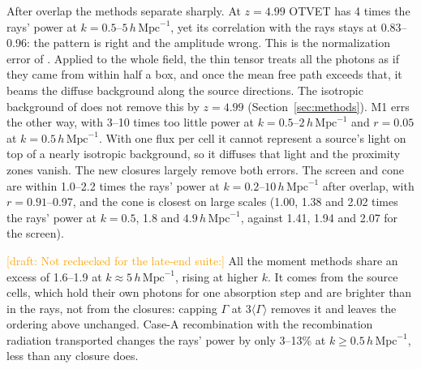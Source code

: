 \documentclass[11pt]{article}
\newcommand{\draft}[1]{\textcolor{orange}{[draft: #1]}}
\newcommand{\hmpc}{\,h\,\mathrm{Mpc}^{-1}}
\begin{document}
After overlap the methods separate sharply. At $z=4.99$ OTVET has
4 times the rays' power at $k=0.5$--$5\hmpc$, yet its correlation with the
rays stays at 0.83--0.96: the pattern is right and the amplitude wrong. This
is the normalization error of \citet{wu21}. Applied to the whole field,
the thin tensor treats all the photons as if they came from within half
a box, and once the mean free path exceeds that, it beams the diffuse
background along the source directions. The isotropic background of
\citet{gnedin01} does not remove this by $z=4.99$
(Section~\ref{sec:methods}). M1 errs the other way, with 3--10
times too little power at $k=0.5$--$2\hmpc$ and $r=0.05$ at $k=0.5\hmpc$.
With one flux per cell it cannot represent a source's light on top of a
nearly isotropic background, so it diffuses that light and the
proximity zones vanish. The new closures largely remove both errors. The
screen and cone are within 1.0--2.2 times the rays' power at
$k=0.2$--$10\hmpc$ after overlap, with $r=0.91$--0.97, and the cone is
closest on large scales (1.00, 1.38 and 2.02 times the rays' power at
$k=0.5$, 1.8 and $4.9\hmpc$, against 1.41, 1.94 and 2.07 for the screen).

\draft{Not rechecked for the late-end suite:} All the moment methods share an excess of 1.6--1.9 at $k\approx5\hmpc$,
rising at higher $k$. It comes from the source cells, which hold their
own photons for one absorption step and are brighter than in the rays,
not from the closures: capping $\Gamma$ at $3\langle\Gamma\rangle$
removes it and leaves the ordering above unchanged. Case-A recombination
with the recombination radiation transported changes the rays' power by
only 3--13\% at $k\ge0.5\hmpc$, less than any closure does.
\end{document}
